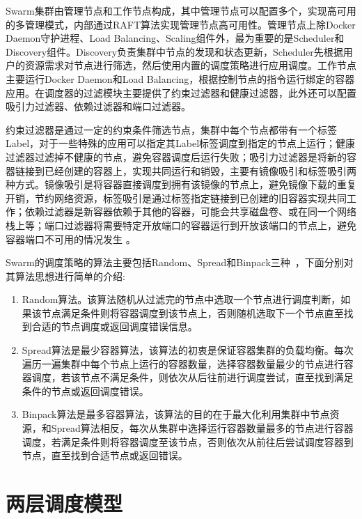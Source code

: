 Swarm集群由管理节点和工作节点构成，其中管理节点可以配置多个，实现高可用的多管理模式，内部通过RAFT算法实现管理节点高可用性。管理节点上除Docker Daemon守护进程、Load Balancing、Scaling组件外，最为重要的是Scheduler和Discovery组件。Discovery负责集群中节点的发现和状态更新，Scheduler先根据用户的资源需求对节点进行筛选，然后使用内置的调度策略进行应用调度。工作节点主要运行Docker Daemon和Load Balancing，根据控制节点的指令运行绑定的容器应用。在调度器的过滤模块主要提供了约束过滤器和健康过滤器，此外还可以配置吸引力过滤器、依赖过滤器和端口过滤器。

约束过滤器是通过一定的约束条件筛选节点，集群中每个节点都带有一个标签Label，对于一些特殊的应用可以指定其Label标签调度到指定的节点上运行；健康过滤器过滤掉不健康的节点，避免容器调度后运行失败；吸引力过滤器是将新的容器链接到已经创建的容器上，实现共同运行和销毁，主要有镜像吸引和标签吸引两种方式。镜像吸引是将容器直接调度到拥有该镜像的节点上，避免镜像下载的重复开销，节约网络资源，标签吸引是通过标签指定链接到已创建的旧容器实现共同工作；依赖过滤器是新容器依赖于其他的容器，可能会共享磁盘卷、或在同一个网络栈上等；端口过滤器将需要特定开放端口的容器运行到开放该端口的节点上，避免容器端口不可用的情况发生	。

Swarm的调度策略的算法主要包括Random、Spread和Binpack三种~\cite{Cerin2017A}，下面分别对其算法思想进行简单的介绍:
\begin{enumerate}[1.]
	\item Random算法。该算法随机从过滤完的节点中选取一个节点进行调度判断，如果该节点满足条件则将容器调度到该节点上，否则随机选取下一个节点直至找到合适的节点调度或返回调度错误信息。
	\item Spread算法是最少容器算法，该算法的初衷是保证容器集群的负载均衡。每次遍历一遍集群中每个节点上运行的容器数量，选择容器数量最少的节点进行容器调度，若该节点不满足条件，则依次从后往前进行调度尝试，直至找到满足条件的节点或返回调度错误。
	\item Binpack算法是最多容器算法，该算法的目的在于最大化利用集群中节点资源，和Spread算法相反，每次从集群中选择运行容器数量最多的节点进行容器调度，若满足条件则将容器调度至该节点，否则依次从前往后尝试调度容器到节点，直至找到合适节点或返回错误。
\end{enumerate}

\section{两层调度模型}
